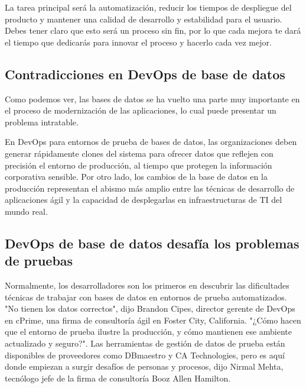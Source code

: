 \documentclass[preprint,12pt]{elsarticle}
\begin{document}
La tarea principal será la automatización, reducir los tiempos de despliegue del producto y mantener una calidad de desarrollo y estabilidad para el usuario. Debes tener claro que esto será un proceso sin fin, por lo que cada mejora te dará el tiempo que dedicarás para innovar el proceso y hacerlo cada vez mejor.\cite{referenciarobles1}

\subsection{Contradicciones en DevOps de base de datos}
Como podemos ver, las bases de datos se ha vuelto una parte muy importante en el proceso de modernización de las aplicaciones, lo cual puede presentar un problema intratable.

En DevOps para entornos de prueba de bases de datos, las organizaciones deben generar rápidamente clones del sistema para ofrecer datos que reflejen con precisión el entorno de producción, al tiempo que protegen la información corporativa sensible. Por otro lado, los cambios de la base de datos en la producción representan el abismo más amplio entre las técnicas de desarrollo de aplicaciones ágil y la capacidad de desplegarlas en infraestructuras de TI del mundo real.\cite{DLake01}

\subsection{DevOps de base de datos desafía los problemas de pruebas}
Normalmente, los desarrolladores son los primeros en descubrir las dificultades técnicas de trabajar con bases de datos en entornos de prueba automatizados.
"No tienen los datos correctos", dijo Brandon Cipes, director gerente de DevOps en cPrime, una firma de consultoría ágil en Foster City, California. "¿Cómo hacen que el entorno de prueba ilustre la producción, y cómo mantienen ese ambiente actualizado y seguro?".
Las herramientas de gestión de datos de prueba están disponibles de proveedores como DBmaestro y CA Technologies, pero es aquí donde empiezan a surgir desafíos de personas y procesos, dijo Nirmal Mehta, tecnólogo jefe de la firma de consultoría Booz Allen Hamilton.
\end{document}
